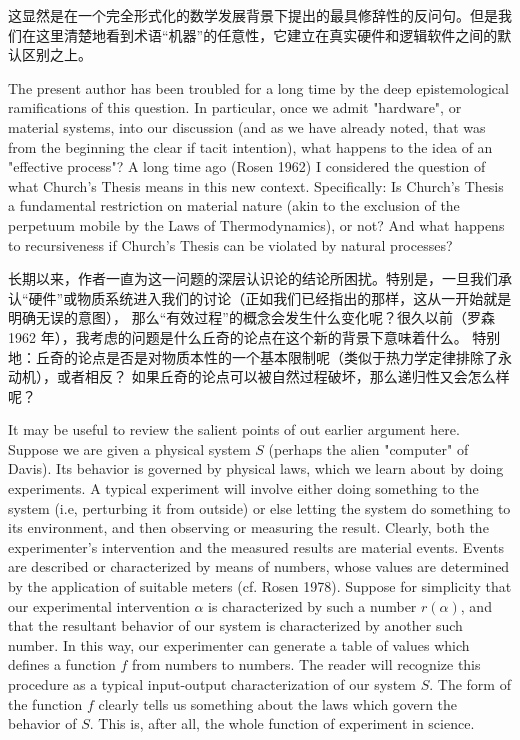 \documentclass[a4paper,12pt]{article}
\begin{document}
这显然是在一个完全形式化的数学发展背景下提出的最具修辞性的反问句。但是我们在这里清楚地看到术语“机器”的任意性，它建立在真实硬件和逻辑软件之间的默认区别之上。

The present author has been troubled for a long time by the deep epistemological ramifications of this question.  In particular,
once we admit "hardware", or material systems, into our discussion (and as we have already noted, that was from the beginning the clear if tacit intention),
what happens to the idea of an "effective process"?  A long time ago (Rosen 1962) I considered the question of what Church's Thesis
means in this new context. Specifically: Is Church's Thesis a fundamental restriction on material nature (akin to the exclusion of the perpetuum
mobile by the Laws of Thermodynamics), or not? And what happens to recursiveness if Church's Thesis can be violated by natural processes?

长期以来，作者一直为这一问题的深层认识论的结论所困扰。特别是，一旦我们承认“硬件”或物质系统进入我们的讨论（正如我们已经指出的那样，这从一开始就是明确无误的意图），
那么“有效过程”的概念会发生什么变化呢？很久以前（罗森 1962 年），我考虑的问题是什么丘奇的论点在这个新的背景下意味着什么。
特别地：丘奇的论点是否是对物质本性的一个基本限制呢（类似于热力学定律排除了永动机），或者相反？ 如果丘奇的论点可以被自然过程破坏，那么递归性又会怎么样呢？

It may be useful to review the salient points of out earlier argument here. Suppose we are given a physical system $S$ (perhaps the alien "computer" of Davis).
Its behavior is governed by physical laws, which we learn about by doing experiments. A typical experiment will involve either doing something to the system
(i.e, perturbing it from outside) or else letting the system do something to its environment, and then observing or measuring the result.
Clearly, both the experimenter's intervention and the measured results are material events. Events are described or characterized by means of
numbers, whose values are determined by the application of suitable meters (cf. Rosen 1978). Suppose for simplicity that our experimental
intervention $\alpha$ is characterized by such a number $r(\alpha)$, and that the resultant behavior of our system is characterized by another such number.
In this way, our experimenter can generate a table of values which defines a function $f$ from numbers to numbers. The reader will recognize
this procedure as a typical input-output characterization of our system $S$.  The form of the function $f$ clearly tells us something about the laws
which govern the behavior of $S$. This is, after all, the whole function of experiment in science.
\end{document}
